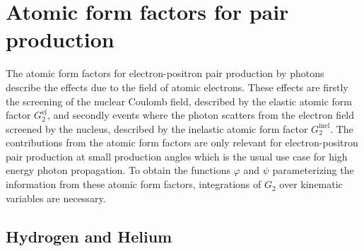 \chapter{Atomic form factors for pair production}
\label{sec:atomic_form_factors}

The atomic form factors for electron-positron pair production by photons describe the effects due to the field of atomic electrons.
These effects are firstly the screening of the nuclear Coulomb field, described by the elastic atomic form factor $G_2^{\text{el}}$, and secondly events where the photon scatters from the electron field screened by the nucleus, described by the inelastic atomic form factor $G_2^{\text{inel}}$.
The contributions from the atomic form factors are only relevant for electron-positron pair production at small production angles which is the usual use case for high energy photon propagation.
To obtain the functions $\varphi$ and $\psi$ parameterizing the information from these atomic form factors, integrations of $G_2$ over kinematic variables are necessary.

\section{Hydrogen and Helium}

